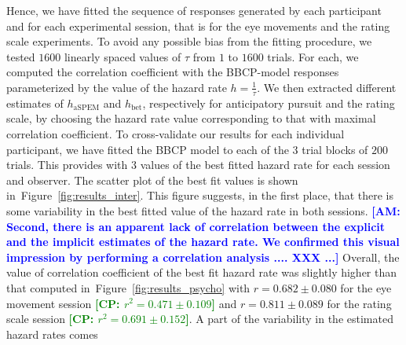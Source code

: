 \documentclass[10pt,letterpaper]{article}
\newcommand{\seeFig}[1]{Figure~\ref{fig:#1}}
\newcommand{\AM}[1]{\textbf{\textcolor{blue}{[AM: #1]}}}
\newcommand{\CP}[1]{\textbf{\textcolor{green}{[CP: #1]}}}
\begin{document}
Hence, we have fitted the sequence of responses generated by each participant and
for each experimental session, that is for the eye movements and the rating scale experiments.
To avoid any possible bias from the fitting procedure,
we tested $1600$ linearly spaced values of $\tau$ from $1$ to $1600$ trials.
For each, we computed the correlation coefficient with the BBCP-model responses parameterized
by the value of the hazard rate $h = \frac 1 \tau$.
We then extracted different estimates of $h_{\text{aSPEM}}$ and $h_{\text{bet}}$,
respectively for anticipatory pursuit and the rating scale,
by choosing the hazard rate value corresponding to that with maximal correlation coefficient.
To cross-validate our results for each individual participant,
we have fitted the BBCP model to each of the $3$ trial blocks of $200$ trials.
This provides with $3$ values of the best fitted hazard rate for each session and observer.
The scatter plot of the best fit values is shown in~\seeFig{results_inter}.
This figure suggests, in the first place, that there is some variability
in the best fitted value of the hazard rate in both sessions. \AM{Second, there is an apparent lack of correlation between the explicit and the implicit estimates of the hazard rate. We confirmed this visual impression by performing a correlation analysis .... XXX ...}
Overall, the value of correlation coefficient of the best fit hazard rate
was slightly higher than that computed in~\seeFig{results_psycho}
with $r = 0.682 \pm 0.080 $ for the eye movement session
\CP{$r^{2} = 0.471 \pm 0.109$}
 and $r = 0.811 \pm 0.089 $ for the rating scale session
 \CP{$r^{2} = 0.691 \pm 0.152$}.
A part of the variability in the estimated hazard rates comes
\end{document}
